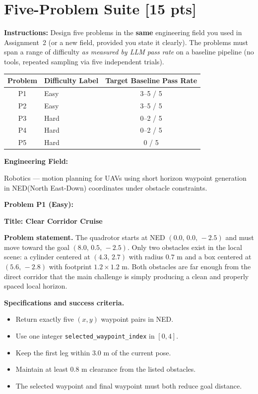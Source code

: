 \documentclass[12pt]{article}
\begin{document}
\newpage
\section{Five-Problem Suite \textnormal{[15 pts]}}
\label{sec:suite_filled}

\textbf{Instructions:} Design five problems in the \textbf{same} engineering
field you used in Assignment~2 (or a new field, provided you state it
clearly). The problems must span a range of difficulty \emph{as measured by
LLM pass rate} on a baseline pipeline (no tools, repeated sampling via five independent trials).

\begin{center}
\begin{tabular}{clc}
\toprule
\textbf{Problem} & \textbf{Difficulty Label} & \textbf{Target Baseline Pass Rate} \\
\midrule
P1 & Easy & 3--5 / 5 \\
P2 & Easy & 3--5 / 5 \\
P3 & Hard & 0--2 / 5 \\
P4 & Hard & 0--2 / 5 \\
P5 & Hard & 0 / 5 \\
\bottomrule
\end{tabular}
\end{center}

\bigskip
\textbf{Engineering Field:}

\medskip
\noindent
Robotics --- motion planning for UAVs using short horizon waypoint generation in NED(North East-Down)
coordinates under obstacle constraints.

\bigskip
\textbf{Problem P1 (Easy):}

\medskip
\noindent\textbf{Title: Clear Corridor Cruise}

\noindent\textbf{Problem statement.}
The quadrotor starts at NED $(0.0,\,0.0,\,-2.5)$ and must move toward the goal
$(8.0,\,0.5,\,-2.5)$.
Only two obstacles exist in the local scene: a cylinder centered at $(4.3,\,2.7)$ with radius
$0.7$ m and a box centered at $(5.6,\,-2.8)$ with footprint $1.2 \times 1.2$ m.
Both obstacles are far enough from the direct corridor that the main challenge is simply producing
a clean and properly spaced local horizon.

\noindent\textbf{Specifications and success criteria.}
\begin{itemize}[leftmargin=1.2em]
  \item Return exactly five $(x,y)$ waypoint pairs in NED.
  \item Use one integer \texttt{selected\_waypoint\_index} in $[0,4]$.
  \item Keep the first leg within $3.0$ m of the current pose.
  \item Maintain at least $0.8$ m clearance from the listed obstacles.
  \item The selected waypoint and final waypoint must both reduce goal distance.
\end{itemize}
\end{document}
